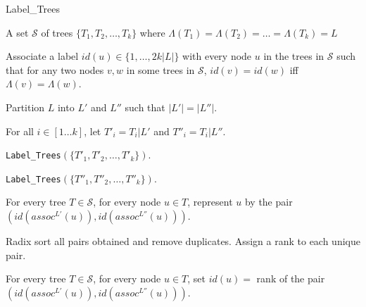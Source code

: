 \documentclass[final,1p,times]{elsarticle}
\newcommand{\leafset}{\Lambda}
\begin{document}



    \begin{algorithm}
        \caption{Label\_Trees}
        \label{alg:labelclusters}

        \begin{algorithmic}[1]
            \Input A set $\mathcal{S}$ of trees $\{T_1, T_2, \dots, T_k\}$ where $\leafset(T_1) = \leafset(T_2) = \dots = \leafset(T_k) = L$

	    \Output Associate a label $id(u) \in \{1, \dots, 2k |L| \}$ with every node $u$ in the trees in $\mathcal{S}$ such that for any two nodes $v, w$ in some trees in $\mathcal{S}$, $id(v) = id(w)$ iff $\leafset(v) = \leafset(w)$.

            \State Partition $L$ into $L'$ and $L''$ such that $|L'| = |L''|$.

            \State For all $i \in [1 \dots k]$, let $T'_i = T_i|L'$ and $T''_i = T_i|L''$.

            \State \texttt{Label\_Trees}$(\{T'_1, T'_2, \dots, T'_k\})$.

            \State \texttt{Label\_Trees}$(\{T''_1, T''_2, \dots, T''_k\})$.

            \State For every tree $T \in \mathcal{S}$, for every node $u \in T$, represent $u$ by the pair $(id(assoc^{L'}(u)), id(assoc^{L''}(u)))$.

            \State Radix sort all pairs obtained and remove duplicates. Assign a rank to each unique pair.

            \State For every tree $T \in \mathcal{S}$, for every node $u \in T$, set $id(u) = $ rank of the pair $(id(assoc^{L'}(u)), id(assoc^{L''}(u)))$.
        \end{algorithmic}
    \end{algorithm}
\end{document}
